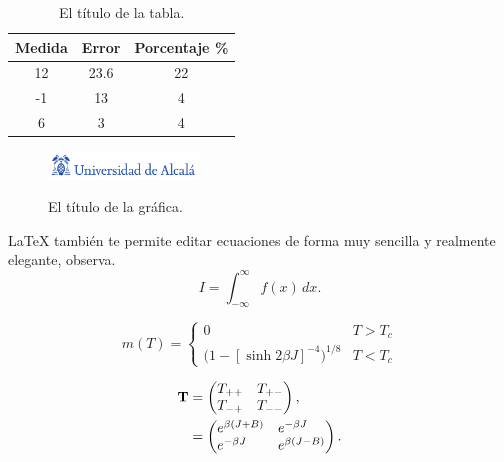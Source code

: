 \begin{table}
\begin{center}
\begin{tabular}{|c|c|c|}\hline
\textbf{Medida} & \textbf{Error} & \textbf{Porcentaje} \% \\ \hline
12 & 23.6 & 22 \\ \hline
-1 & 13 & 4 \\ \hline
6 & 3 & 4 \\ \hline
\end{tabular}
\caption[El título corto de la tabla.]{El título de la tabla.}
\label{tabla:primera}
\end{center}
\end{table}

\begin{figure}
\begin{center}
\includegraphics[width=4cm]{figuras/logo-uah.pdf}\\
\end{center}
\caption[El título corto de la gráfica.]{El título de la gráfica.}
\label{grafico:primero}
\end{figure}


\LaTeX{} también te permite editar ecuaciones de forma muy sencilla y realmente elegante, observa.
\begin{equation}
I = \! \int_{-\infty}^\infty f(x)\,dx \label{eq:fine}.
\end{equation}

\begin{equation}
\label{eq:mdiv}
m(T) =
\begin{cases}
0 & \text{$T > T_c$} \\
\bigl(1 - [\sinh 2 \beta J]^{-4} \bigr)^{\! 1/8} & \text{$T < T_c$}
\end{cases}
\end{equation}

\begin{align}
\textbf{T} &=
\begin{pmatrix}
T_{++} \hfill & T_{+-} \\
T_{-+} & T_{--} \hfill 
\end{pmatrix} , \nonumber \\
& =
\begin{pmatrix}
e^{\beta (J + B)} \hfill & e^{-\beta J} \hfill \\
e^{-\beta J} \hfill & e^{\beta (J - B)} \hfill
\end{pmatrix}.
\end{align}

